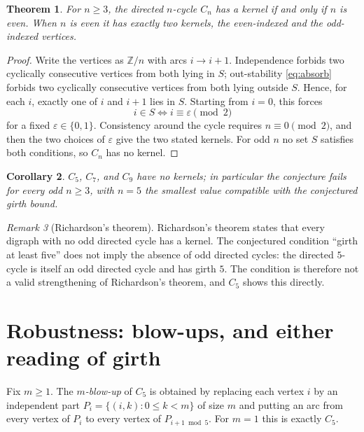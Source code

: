 \documentclass[11pt]{article}
\newtheorem{theorem}{Theorem}
\newtheorem{corollary}[theorem]{Corollary}
\theoremstyle{definition}
\theoremstyle{remark}
\newtheorem{remark}[theorem]{Remark}
\newcommand{\Cfive}{C_5}
\begin{document}
\begin{theorem}\label{thm:cycles}
For $n \ge 3$, the directed $n$-cycle $C_n$ has a kernel if and only if $n$ is
even. When $n$ is even it has exactly two kernels, the even-indexed and the
odd-indexed vertices.
\end{theorem}

\begin{proof}
Write the vertices as $\mathbb{Z}/n$ with arcs $i \to i+1$. Independence forbids
two cyclically consecutive vertices from both lying in $S$; out-stability
\eqref{eq:absorb} forbids two cyclically consecutive vertices from both lying
outside $S$. Hence, for each $i$, exactly one of $i$ and $i+1$ lies in $S$.
Starting from $i = 0$, this forces
\[
i \in S \iff i \equiv \varepsilon \pmod 2
\]
for a fixed $\varepsilon \in \{0, 1\}$. Consistency around the cycle requires
$n \equiv 0 \pmod 2$, and then the two choices of $\varepsilon$ give the two
stated kernels. For odd $n$ no set $S$ satisfies both conditions, so $C_n$ has
no kernel.
\end{proof}

\begin{corollary}\label{cor:odd}
$C_5$, $C_7$, and $C_9$ have no kernels; in particular the conjecture fails for
every odd $n \ge 3$, with $n = 5$ the smallest value compatible with the
conjectured girth bound.
\end{corollary}

\begin{remark}[Richardson's theorem]
Richardson's theorem states that every digraph with no odd directed cycle has a
kernel. The conjectured condition ``girth at least five'' does not imply the
absence of odd directed cycles: the directed $5$-cycle is itself an odd directed
cycle and has girth $5$. The condition is therefore not a valid strengthening of
Richardson's theorem, and $\Cfive$ shows this directly.
\end{remark}

\section{Robustness: blow-ups, and either reading of girth}

Fix $m \ge 1$. The \emph{$m$-blow-up} of $\Cfive$ is obtained by replacing each
vertex $i$ by an independent part $P_i = \{(i,k) : 0 \le k < m\}$ of size $m$ and
putting an arc from every vertex of $P_i$ to every vertex of $P_{i+1 \bmod 5}$.
For $m = 1$ this is exactly $\Cfive$.
\end{document}
